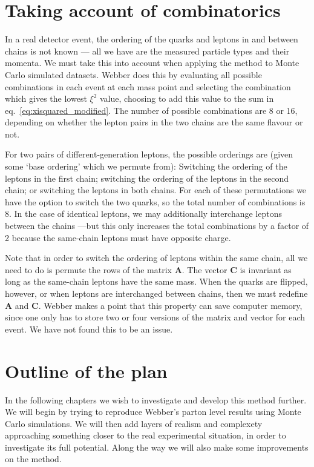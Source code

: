 \documentclass[twoside,english]{uiofysmaster}
\begin{document}
\section{Taking account of combinatorics}
\label{sec:combinatorics}
In a real detector event, the ordering of the quarks and leptons in and between chains is not known --- all we have are the measured particle types and their momenta. We must take this into account when applying the method to Monte Carlo simulated datasets. Webber does this by evaluating all possible combinations in each event at each mass point and selecting the combination which gives the lowest $\xi^2$ value, choosing to add this value to the sum in eq.\ \eqref{eq:xisquared_modified}. The number of possible combinations are 8 or 16, depending on whether the lepton pairs in the two chains are the same flavour or not. 

For two pairs of different-generation leptons, the possible orderings are (given some `base ordering' which we permute from): Switching the ordering of the leptons in the first chain; switching the ordering of the leptons in the second chain; or switching the leptons in both chains. For each of these permutations we have the option to switch the two quarks, so the total number of combinations is 8. In the case of identical leptons, we may additionally interchange leptons between the chains ---but this only increases the total combinations by a factor of 2 because the same-chain leptons must have opposite charge.

Note that in order to switch the ordering of leptons within the same chain, all we need to do is permute the rows of the matrix $\mathbf{A}$. The vector $\mathbf{C}$ is invariant as long as the same-chain leptons have the same mass. When the quarks are flipped, however, or when leptons are interchanged between chains, then we must redefine $\mathbf{A}$ and $\mathbf{C}$. Webber makes a point that this property can save computer memory, since one only has to store two or four versions of the matrix and vector for each event. We have not found this to be an issue.












\section{Outline of the plan}
In the following chapters we wish to investigate and develop this method further. We will begin by trying to reproduce Webber's parton level results using Monte Carlo simulations. We will then add layers of realism and complexety approaching something closer to the real experimental situation, in order to investigate its full potential. Along the way we will also make some improvements on the method.
\end{document}
